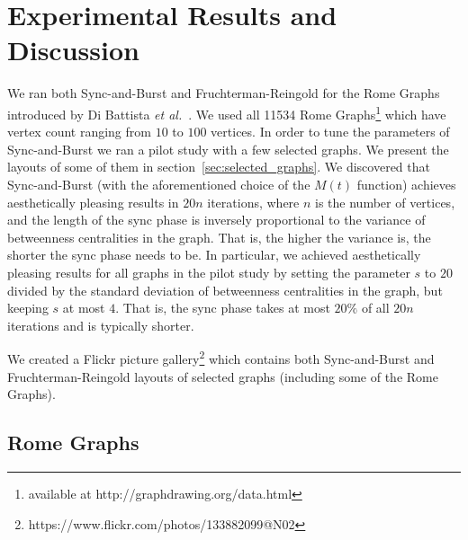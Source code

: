 \documentclass{llncs}
\begin{document}
\section{Experimental Results and Discussion}\label{sec:results}

We ran both Sync-and-Burst and Fruchterman-Reingold for the Rome Graphs introduced by Di Battista \emph{et al.}~\cite{DiBattista1997}. We used all 11534 Rome Graphs\footnote{available at http://graphdrawing.org/data.html} which have vertex count ranging from $10$ to $100$ vertices. In order to tune the parameters of Sync-and-Burst we ran a pilot study with a few selected graphs. We present the layouts of some of them in section~\ref{sec:selected_graphs}. We discovered that Sync-and-Burst (with the aforementioned choice of the $M(t)$ function) achieves aesthetically pleasing results in $20n$ iterations, where $n$ is the number of vertices, and the length of the sync phase is inversely proportional to the variance of betweenness centralities in the graph. That is, the higher the variance is, the shorter the sync phase needs to be. In particular, we achieved aesthetically pleasing results for all graphs in the pilot study by setting the parameter $s$ to $20$ divided by the standard deviation of betweenness centralities in the graph, but keeping $s$ at most $4$. That is, the sync phase takes at most $20\%$ of all $20n$ iterations and is typically shorter.

We created a Flickr picture gallery\footnote{https://www.flickr.com/photos/133882099@N02} which contains both Sync-and-Burst and Fruchterman-Reingold layouts of selected graphs (including some of the Rome Graphs). 

\subsection{Rome Graphs}\label{sec:rome_graphs}
\end{document}
